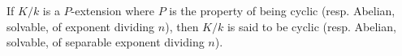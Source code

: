 If $K/k$ is a $P$-extension where $P$ is the property of being cyclic (resp. Abelian, solvable, of exponent dividing $n$), then $K/k$ is said to be cyclic (resp. Abelian, solvable, of separable exponent dividing $n$).
